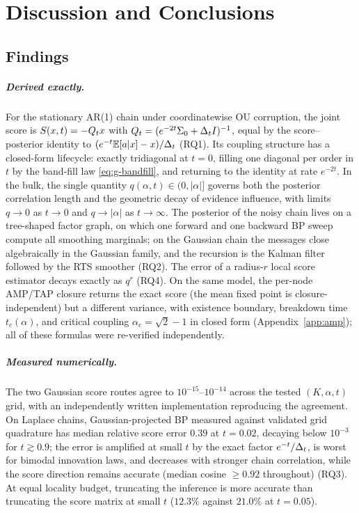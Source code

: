 \chapter{Discussion and Conclusions}\label{ch:conclusions}

\section{Findings}\label{sec:conclusions-findings}\label{sec:conclusions-amp}

\paragraph{Derived exactly.} For the stationary AR(1) chain under
coordinatewise OU corruption, the joint score is $S(x,t) = -Q_t x$
with $Q_t = (e^{-2t}\Sigma_0 + \Delta_t I)^{-1}$, equal by the
score--posterior identity to $(e^{-t}\mathbb{E}[a|x] - x)/\Delta_t$ (RQ1). Its
coupling structure has a closed-form lifecycle: exactly tridiagonal at
$t = 0$, filling one diagonal per order in $t$ by the band-fill law
\eqref{eq:g-bandfill}, and returning to the identity at rate $e^{-2t}$.
In the bulk, the single quantity $q(\alpha, t) \in (0, |\alpha|]$ governs
both the posterior correlation length and the geometric decay of evidence
influence, with limits $q \to 0$ as $t \to 0$ and $q \to |\alpha|$ as
$t \to \infty$. The posterior of the noisy chain lives on a tree-shaped
factor graph, on which one forward and one backward BP sweep compute all
smoothing marginals; on the Gaussian chain the messages close
algebraically in the Gaussian family, and the recursion is the Kalman
filter followed by the RTS smoother (RQ2). The
error of a radius-$r$ local score estimator decays exactly as $q^r$
(RQ4). On the same model, the per-node AMP/TAP closure returns the exact
score (the mean fixed point is closure-independent) but a different
variance, with existence boundary, breakdown time $t_c(\alpha)$, and
critical coupling $\alpha_c = \sqrt{2} - 1$ in closed form
(Appendix~\ref{app:amp}); all of these formulas were re-verified
independently.

\paragraph{Measured numerically.} The two Gaussian score routes agree to
$10^{-15}$--$10^{-14}$ across the tested $(K, \alpha, t)$ grid, with an
independently written implementation reproducing the agreement. On
Laplace chains, Gaussian-projected BP measured against validated grid
quadrature has median relative score error $0.39$ at $t = 0.02$,
decaying below $10^{-3}$ for $t \gtrsim 0.9$; the error is amplified at
small $t$ by the exact factor $e^{-t}/\Delta_t$, is worst for bimodal
innovation laws, and decreases with stronger chain correlation, while
the score direction remains accurate (median cosine $\geq 0.92$
throughout) (RQ3). At equal locality budget, truncating the inference is
more accurate than truncating the score matrix at small $t$ ($12.3\%$
against $21.0\%$ at $t = 0.05$).

